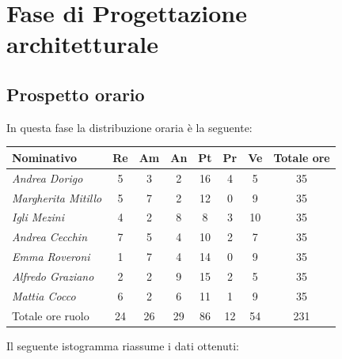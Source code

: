 {{{{\section{Fase di Progettazione architetturale}\label{PreventivoFaseDiProgettazioneArchitetturale}

\subsection{Prospetto orario}\label{PreventivoFaseDiProgettazioneArchitetturaleProspettoOrario}
In questa fase la distribuzione oraria è la seguente:
\quad
\def\tabularxcolumn#1{m{#1}}
{
	
	\begin{center}
		\renewcommand{\arraystretch}{1.4}
		\begin{tabularx}{\textwidth}{|X|c|c|c|c|c|c|c|}
			\hline
			\rowcolor{airforceblue}
			\textbf{Nominativo} & \textbf{Re} & \textbf{Am} & \textbf{An} & \textbf{Pt} & \textbf{Pr} & \textbf{Ve} & \textbf{Totale ore}\\
			\hline
			\textit{Andrea Dorigo} & 5 & 3 & 2 & 16 & 4 & 5 & 35\\
			\hline
			\textit{Margherita Mitillo} & 5 & 7 & 2 & 12 & 0 & 9 & 35\\
			\hline
			\textit{Igli Mezini} & 4 & 2 & 8 & 8 & 3 & 10 & 35\\
			\hline
			\textit{Andrea Cecchin} & 7 & 5 & 4 & 10 & 2 & 7 & 35\\
			\hline
			\textit{Emma Roveroni} & 1 & 7 & 4 & 14 & 0 & 9 & 35\\
			\hline
			\textit{Alfredo Graziano} & 2 & 2 & 9 & 15 & 2 & 5 & 35\\
			\hline
			\textit{Mattia Cocco} & 6 & 2 & 6 & 11 & 1 & 9 & 35\\
			\hline
			Totale ore ruolo & 24 & 26 & 29 & 86 & 12 & 54 & 231\\
			\hline
		\end{tabularx}
	\end{center}

Il seguente istogramma riassume i dati ottenuti:

}}}}}
